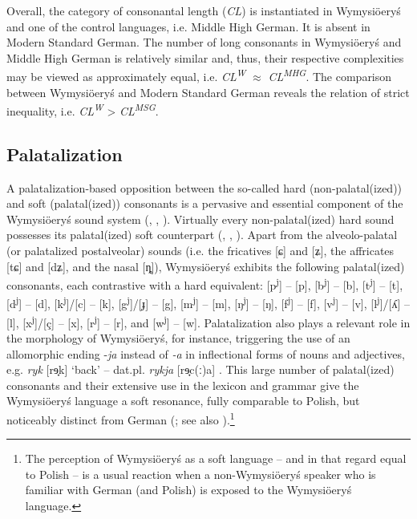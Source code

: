 \documentclass[output=paper,hidelinks]{langscibook}
\begin{document}
Overall, the category of consonantal length (\textit{CL}) is instantiated in Wymysiöeryś and one of the control languages, i.e. Middle High German. It is absent in Modern Standard German. The number of long consonants in Wymysiöeryś and Middle High German is relatively similar and, thus, their respective complexities may be viewed as approximately equal, i.e. \textit{CL\textsuperscript{W}} ${\approx}$ \textit{CL\textsuperscript{MHG}}. The comparison between Wymysiöeryś and Modern Standard German reveals the relation of strict inequality, i.e. \textit{CL\textsuperscript{W}} > \textit{CL\textsuperscript{MSG}}.

\subsection{Palatalization}\label{sec:wymsorys:3.9}
A palatalization-based opposition between the so-called hard (non-palatal(ized)) and soft (palatal(ized)) consonants is a pervasive and essential component of the Wymysiöeryś sound system (\citealt{kleczkowski_dialekt_1920, anders_gedichte_1933}, \citealt[402, 405--409]{wicherkiewicz_making_2003}, \citealt{Andrason2021}). Virtually every non-palatal(ized) hard sound possesses its palatal(ized) soft counterpart (\citealt[15]{kleczkowski_dialekt_1920}, \citealt[xv]{mojmir_worterbuch}, \citealt{andrason_grammar_2016}). Apart from the alveolo-palatal (or palatalized postalveolar) sounds (i.e. the fricatives [ɕ] and [ʑ], the affricates [tɕ] and [dʑ], and the nasal [ȵ]), Wymysiöeryś exhibits the following palatal(ized) consonants, each contrastive with a hard equivalent: [p\textsuperscript{j}] – [p], [b\textsuperscript{j}] – [b], [t\textsuperscript{j}] – [t], [d\textsuperscript{j}] – [d], [k\textsuperscript{j}]/[c] – [k], [g\textsuperscript{j}]/[ɟ] – [g], [m\textsuperscript{j}] – [m], [ŋ\textsuperscript{j}] – [ŋ], [f\textsuperscript{j}] – [f], [v\textsuperscript{j}] – [v], [l\textsuperscript{j}]/[ʎ] – [l], [x\textsuperscript{j}]/[ç] – [x], [r\textsuperscript{j}] – [r], and [w\textsuperscript{j}] – [w]. Palatalization also plays a relevant role in the morphology of Wymysiöeryś, for instance, triggering the use of an allomorphic ending -\textit{ja} instead of \textit{{}-a} in inflectional forms of nouns and adjectives, e.g. \textit{ryk} [rɘ̟k] `back' – dat.pl. \textit{rykja} [rɘ̟c(ː)a] \citep{andrason_szkic_2014, andrason_vilamovicean_2015, andrason_grammar_2016}. This large number of palatal(ized) consonants and their extensive use in the lexicon and grammar give the Wymysiöeryś language a soft resonance, fully comparable to Polish, but noticeably distinct from German (\citealt{kleczkowski_dialekt_1920}; see also \cite[271--272]{latosinski_monografia_1909}).\footnote{The perception of Wymysiöeryś as a soft language – and in that regard equal to Polish – is a usual reaction when a non-Wymysiöeryś speaker who is familiar with German (and Polish) is exposed to the Wymysiöeryś language.} 
\end{document}
